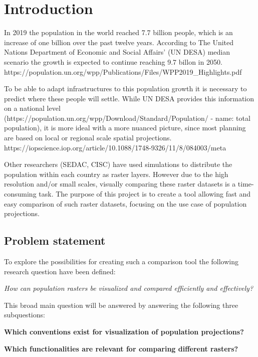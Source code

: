 \chapter{Introduction}

In 2019 the population in the world reached 7.7 billion people, which is an increase of one billion over the past twelve years. According to The United Nations Department of Economic and Social Affairs’ (UN DESA) median scenario the growth is expected to continue reaching 9.7 billon in 2050.
https://population.un.org/wpp/Publications/Files/WPP2019\_Highlights.pdf

To be able to adapt infrastructures to this population growth it is necessary to predict where these people will settle. While UN DESA provides this information on a national level (https://population.un.org/wpp/Download/Standard/Population/ - name: total population), it is more ideal with a more nuanced picture, since most planning are based on local or regional scale spatial projections.
https://iopscience.iop.org/article/10.1088/1748-9326/11/8/084003/meta

Other researchers (SEDAC, CISC) have used simulations to distribute the population within each country as raster layers. However due to the high resolution and/or small scales, visually comparing these raster datasets is a time-consuming task. The purpose of this project is to create a tool allowing fast and easy comparison of such raster datasets, focusing on the use case of population projections.


\section{Problem statement}

To explore the possibilities for creating such a comparison tool the following research question have been defined:

\textit{How can population rasters be visualized and compared efficiently and effectively?}

This broad main question will be answered by answering the following three subquestions:

\textbf{Which conventions exist for visualization of population projections?}

\textbf{Which functionalities are relevant for comparing different rasters?}


